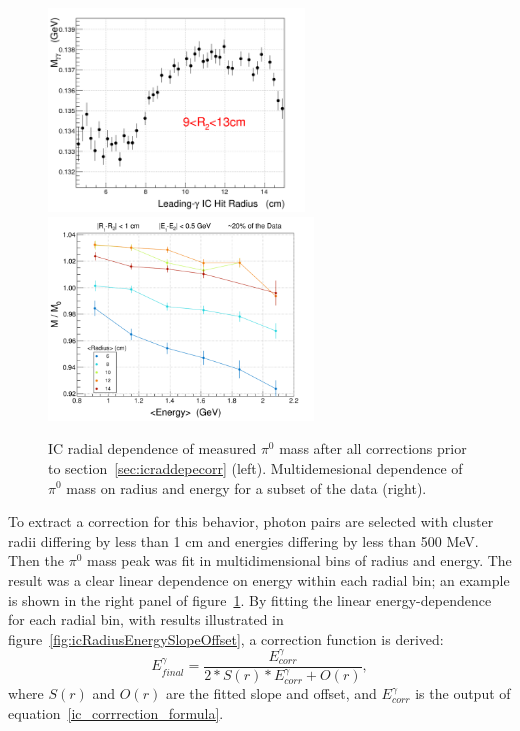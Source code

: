 \begin{figure}[tp]\centering
    \includegraphics[height=5.4cm]{fig_simulation/Mgg_radius_2plateau.png}
    \includegraphics[height=5.4cm]{fig_simulation/m_m0_pi0_radius_nathan.png}
    \caption{IC radial dependence of measured $\pi^0$ mass after all corrections prior to section~\ref{sec:icraddepecorr} (left).  Multidemesional dependence of $\pi^0$ mass on radius and energy for a subset of the data (right).\label{fig:icRadiusEnergyData}}
\end{figure}

To extract a correction for this behavior, photon pairs are selected with cluster radii differing by less than 1 cm and energies differing by less than 500 MeV.  Then the $\pi^0$ mass peak was fit in multidimensional bins of radius and energy.  The result was a clear linear dependence on energy within each radial bin; an example is shown in the right panel of figure~\ref{fig:icRadiusEnergyData}.  By fitting the linear energy-dependence for each radial bin, with results illustrated in figure~\ref{fig:icRadiusEnergySlopeOffset}, a correction function is derived:
\begin{equation}
E^{\gamma}_{final} = \frac{E^{\gamma}_{corr}}{2*S(r)*E^{\gamma}_{corr} + O(r)},
\end{equation}
where $S(r)$ and $O(r)$ are the fitted slope and offset, and $E_{corr}^\gamma$ is the output of equation~\ref{ic_corrrection_formula}.

